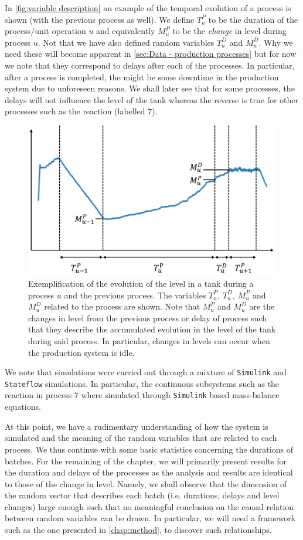 \documentclass[../Thesis.tex]{subfiles}
\begin{document}
In \autoref{fig:variable description} an example of the temporal evolution of a process is shown (with the previous process as well). We define $T^P_u$ to be the duration of the process/unit operation $u$ and equivalently $M^P_u$ to be the \textit{change} in level during process $u$. Not that we have also defined random variables $T^D_u$ and $M^D_u$. Why we need these will become apparent in \autoref{sec:Data - production processes} but for now we note that they correspond to delays after each of the processes. In particular, after a process is completed, the might be some downtime in the production system due to unforeseen reasons. We shall later see that for some processes, the delays will not influence the level of the tank whereas the reverse is true for other processes such as the reaction (labelled $7$).

\begin{figure}[ht]
    \centering
    \includegraphics[width=.7\linewidth]{figures/Multiple cycles data/variable desciption.png}
    \caption{Exemplification of the evolution of the level in a tank during a process $u$ and the previous process. The variables $T_u^P$, $T^D_u$, $M_u^P$ and $M^D_u$ related to the process are shown. Note that $M^P_u$ and $M^D_u$ are the changes in level from the previous process or delay of process such that they describe the accumulated evolution in the level of the tank during said process. In particular, changes in levels can occur when the production system is idle.}
    \label{fig:variable description}
\end{figure}

We note that simulations were carried out through a mixture of \texttt{Simulink} and \texttt{Stateflow} simulations. In particular, the continuous subsystems such as the reaction in process $7$ where simulated through \texttt{Simulink} based mass-balance equations.

At this point, we have a rudimentary understanding of how the system is simulated and the meaning of the random variables that are related to each process. We thus continue with some basic statistics concerning the durations of batches. For the remaining of the chapter, we will primarily present results for the duration and delays of the processes as the analysis and results are identical to those of the change in level. Namely, we shall observe that the dimension of the random vector that describes each batch (i.e. durations, delays and level changes) large enough such that no meaningful conclusion on the causal relation between random variables can be drawn. In particular, we will need a framework such as the one presented in \autoref{chap:method}, to discover such relationships.
\end{document}

